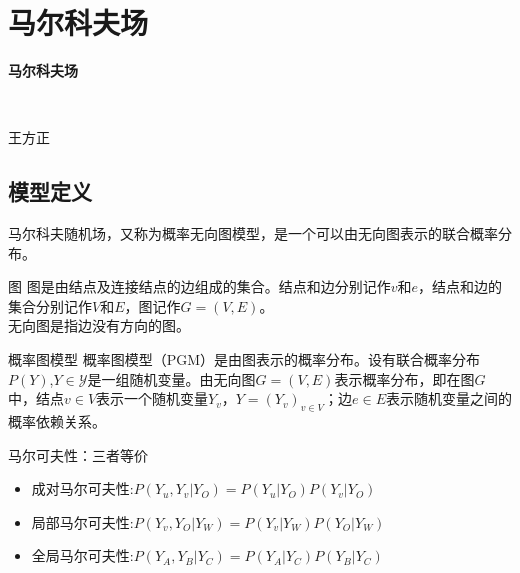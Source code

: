 \section*{马尔科夫场}

\begin{frame}
	\centerline{\textbf{\Large{马尔科夫场}}} 
	~\\
	\centerline{\large{王方正}}
\end{frame}

\subsection*{模型定义}
\begin{frame}
	马尔科夫随机场，又称为概率无向图模型，是一个可以由无向图表示的联合概率分布。
\end{frame}

\begin{frame}

	\begin{block}{图}
		图是由结点及连接结点的边组成的集合。结点和边分别记作$v$和$e$，结点和边的集合分别记作$V$和$E$，图记作$G=(V,E)$。\\
		无向图是指边没有方向的图。
	\end{block}

	\begin{block}{概率图模型}
		概率图模型（PGM）是由图表示的概率分布。设有联合概率分布$P(Y)$,$Y\in\mathcal{Y}$是一组随机变量。由无向图$G=(V,E)$表示概率分布，即在图$G$中，结点$v\in V$表示一个随机变量$Y_v$，$Y=(Y_v)_{v\in V}$；边$e\in E$表示随机变量之间的概率依赖关系。
	\end{block}

\end{frame}

\begin{frame}
	马尔可夫性：三者等价
	
	\begin{itemize}
		\item 成对马尔可夫性:$P(Y_u,Y_v|Y_O)=P(Y_u|Y_O)P(Y_v|Y_O)$
		\item 局部马尔可夫性:$P(Y_v,Y_O|Y_W)=P(Y_v|Y_W)P(Y_O|Y_W)$
		\item 全局马尔可夫性:$P(Y_A,Y_B|Y_C)=P(Y_A|Y_C)P(Y_B|Y_C)$
	\end{itemize}

\end{frame}

